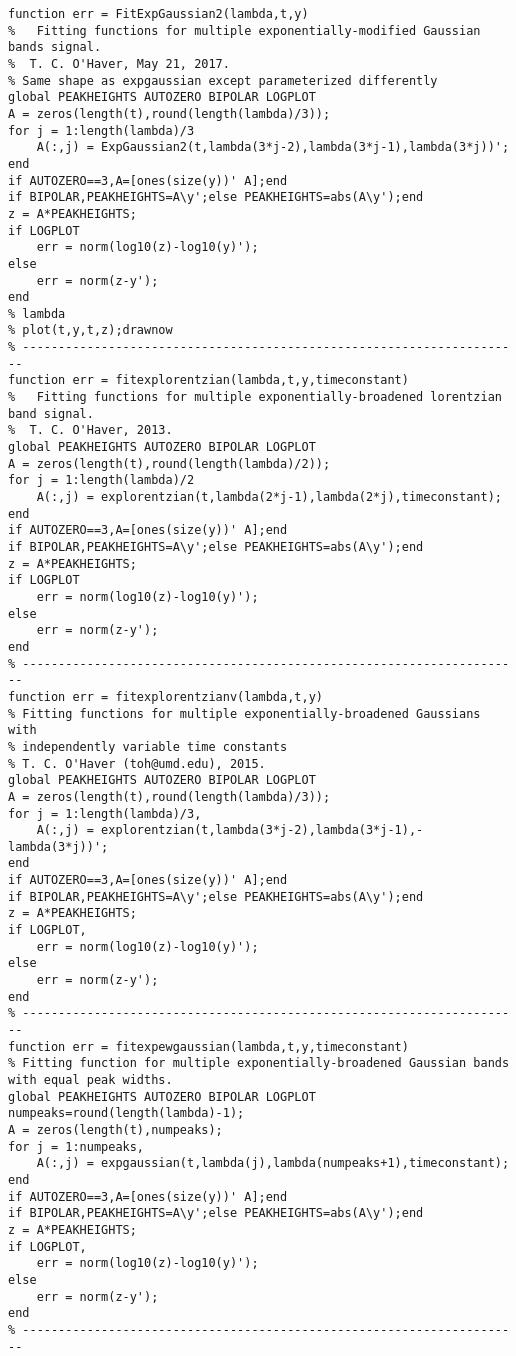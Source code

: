 \begin{lstlisting}
function err = FitExpGaussian2(lambda,t,y)
%   Fitting functions for multiple exponentially-modified Gaussian bands signal.
%  T. C. O'Haver, May 21, 2017.
% Same shape as expgaussian except parameterized differently
global PEAKHEIGHTS AUTOZERO BIPOLAR LOGPLOT
A = zeros(length(t),round(length(lambda)/3));
for j = 1:length(lambda)/3
    A(:,j) = ExpGaussian2(t,lambda(3*j-2),lambda(3*j-1),lambda(3*j))';
end
if AUTOZERO==3,A=[ones(size(y))' A];end
if BIPOLAR,PEAKHEIGHTS=A\y';else PEAKHEIGHTS=abs(A\y');end
z = A*PEAKHEIGHTS;
if LOGPLOT
    err = norm(log10(z)-log10(y)');
else
    err = norm(z-y');
end
% lambda
% plot(t,y,t,z);drawnow
% ----------------------------------------------------------------------
function err = fitexplorentzian(lambda,t,y,timeconstant)
%   Fitting functions for multiple exponentially-broadened lorentzian band signal.
%  T. C. O'Haver, 2013.
global PEAKHEIGHTS AUTOZERO BIPOLAR LOGPLOT
A = zeros(length(t),round(length(lambda)/2));
for j = 1:length(lambda)/2
    A(:,j) = explorentzian(t,lambda(2*j-1),lambda(2*j),timeconstant);
end
if AUTOZERO==3,A=[ones(size(y))' A];end
if BIPOLAR,PEAKHEIGHTS=A\y';else PEAKHEIGHTS=abs(A\y');end
z = A*PEAKHEIGHTS;
if LOGPLOT
    err = norm(log10(z)-log10(y)');
else
    err = norm(z-y');
end
% ----------------------------------------------------------------------
function err = fitexplorentzianv(lambda,t,y)
% Fitting functions for multiple exponentially-broadened Gaussians with
% independently variable time constants
% T. C. O'Haver (toh@umd.edu), 2015.
global PEAKHEIGHTS AUTOZERO BIPOLAR LOGPLOT
A = zeros(length(t),round(length(lambda)/3));
for j = 1:length(lambda)/3,
    A(:,j) = explorentzian(t,lambda(3*j-2),lambda(3*j-1),-lambda(3*j))';
end
if AUTOZERO==3,A=[ones(size(y))' A];end
if BIPOLAR,PEAKHEIGHTS=A\y';else PEAKHEIGHTS=abs(A\y');end
z = A*PEAKHEIGHTS;
if LOGPLOT,
    err = norm(log10(z)-log10(y)');
else
    err = norm(z-y');
end
% ----------------------------------------------------------------------
function err = fitexpewgaussian(lambda,t,y,timeconstant)
% Fitting function for multiple exponentially-broadened Gaussian bands with equal peak widths.
global PEAKHEIGHTS AUTOZERO BIPOLAR LOGPLOT
numpeaks=round(length(lambda)-1);
A = zeros(length(t),numpeaks);
for j = 1:numpeaks,
    A(:,j) = expgaussian(t,lambda(j),lambda(numpeaks+1),timeconstant);
end
if AUTOZERO==3,A=[ones(size(y))' A];end
if BIPOLAR,PEAKHEIGHTS=A\y';else PEAKHEIGHTS=abs(A\y');end
z = A*PEAKHEIGHTS;
if LOGPLOT,
    err = norm(log10(z)-log10(y)');
else
    err = norm(z-y');
end
% ----------------------------------------------------------------------

\end{lstlisting}
